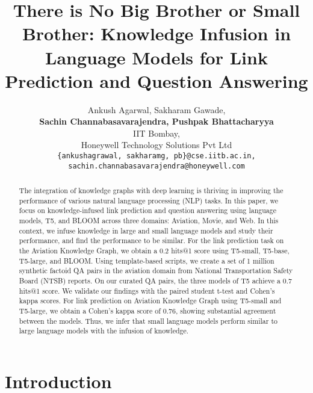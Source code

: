 \documentclass[11pt]{article}
\title{There is No Big Brother or Small Brother: Knowledge Infusion in Language Models for Link Prediction and Question Answering}
\author{Ankush Agarwal, Sakharam Gawade, \\\textbf{Sachin Channabasavarajendra, Pushpak Bhattacharyya}\\
        IIT Bombay, \\Honeywell Technology Solutions Pvt Ltd \\
        \texttt{\{ankushagrawal, sakharamg, pb\}@cse.iitb.ac.in,}\\
         \texttt{sachin.channabasavarajendra@honeywell.com}}
\begin{document}
\maketitle
\def\thefootnote{*}\def\thefootnote{\arabic{footnote}}

\begin{abstract}

The integration of knowledge graphs with deep learning is thriving in improving the performance of various natural language processing (NLP) tasks. In this paper, we focus on knowledge-infused link prediction and question answering using language models, T5, and BLOOM across three domains: Aviation, Movie, and Web. 
In this context, we infuse knowledge in large and small language models and study their performance, and find the performance to be similar. For the link prediction task on the Aviation Knowledge Graph, we obtain a 0.2 hits@1 score using T5-small, T5-base, T5-large, and BLOOM. Using template-based scripts, we create a set of 1 million synthetic factoid QA pairs in the aviation domain from National Transportation Safety Board (NTSB) reports. On our curated QA pairs, the three models of T5 achieve a 0.7 hits@1 score. 
We validate our findings with the paired student t-test and Cohen's kappa scores. 
For link prediction on Aviation Knowledge Graph using T5-small and T5-large, we obtain a Cohen's kappa score of 0.76, showing substantial agreement between the models. Thus, we infer that small language models perform similar to large language models with the infusion of knowledge.
\end{abstract}


\section{Introduction} \label{intro}
\end{document}
